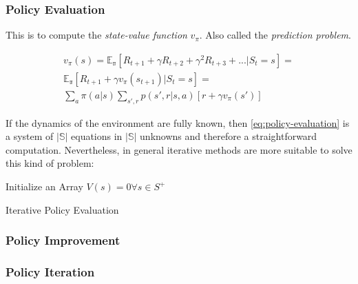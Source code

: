 \documentclass[paper=a4,fontsize=11pt]{scrartcl} %
\numberwithin{equation}{section} %
\numberwithin{figure}{section} %
\numberwithin{table}{section} %
\begin{document}
\subsubsection{Policy Evaluation}

This is to compute the \textit{state-value function} $v_\pi$. 
Also called the \textit{prediction problem}.

\begin{equation}
    \begin{aligned}
        v_\pi(s) = \mathbb{E_\pi} \left[ 
            R_{t+1} + \gamma R_{t+2} + \gamma^2 R_{t+3} + ... | S_t = s
        \right] = \\ 
        \mathbb{E_\pi} \left[ 
            R_{t+1} + \gamma v_\pi(s_{t+1}) | S_t = s
        \right] = \\
        \sum_a \pi(a|s) \sum_{s',r} p(s',r|s, a) \left[ r + \gamma v_\pi(s') \right]
    \end{aligned}
    \label{eq:policy-evaluation}
\end{equation}

If the dynamics of the environment are fully known, then \ref{eq:policy-evaluation}
is a system of $|\mathbb{S}|$ equations in $|\mathbb{S}|$ unknowns and therefore
a straightforward computation. Nevertheless, in general iterative methods are more 
suitable to solve this kind of problem: \\

\begin{algorithm}[H]
    \SetAlgoLined
     Initialize an Array $V(s)=0 \forall s \in S^+ $ \;
     \caption{Iterative Policy Evaluation}
\end{algorithm}

\subsubsection{Policy Improvement}

\subsubsection{Policy Iteration}
\end{document}
